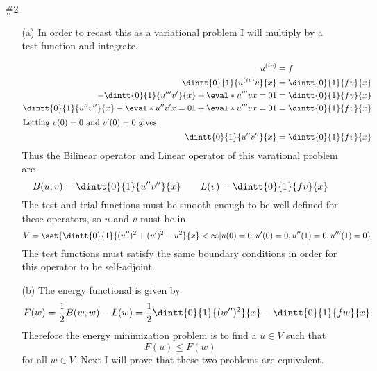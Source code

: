 \documentclass[11pt, oneside]{article}
\begin{document}
\begin{enumerate}
\begin{enumerate}
    \item[(g)]
    \end{enumerate}

  \item[\#2]
    \begin{enumerate}
      \item[(a)]
        In order to recast this as a variational problem I will multiply by a
        test function and integrate.

        \begin{align*}
          u^{(iv)} &= f \\
          \dintt{0}{1}{u^{(iv)}v}{x} &= \dintt{0}{1}{fv}{x} \\
          -\dintt{0}{1}{u'''v'}{x} + \eval*{u'''v}{x = 0}{1} &= \dintt{0}{1}{fv}{x} \\
          \dintt{0}{1}{u''v''}{x} - \eval*{u''v'}{x = 0}{1} + \eval*{u'''v}{x = 0}{1} &= \dintt{0}{1}{fv}{x} \\
          \intertext{Letting $v(0) = 0$ and $v'(0) = 0$ gives}
          \dintt{0}{1}{u''v''}{x} &= \dintt{0}{1}{fv}{x} \\
        \end{align*}
        Thus the Bilinear operator and Linear operator of this varational
        problem are
        \[
          B(u, v) = \dintt{0}{1}{u''v''}{x} \qquad L(v) = \dintt{0}{1}{fv}{x}
        \]
        The test and trial functions must be smooth enough to be well defined
        for these operators, so $u$ and $v$ must be in
        \[
          V = \set{\dintt{0}{1}{(u'')^2 + (u')^2 + u^2}{x} < \infty | u(0) = 0,
            u'(0) = 0, u''(1) = 0, u'''(1) = 0}
        \]
        The test functions must satisfy the same boundary conditions in order
        for this operator to be self-adjoint.

      \item[(b)]
        The energy functional is given by
        \[
          F(w) = \frac{1}{2}B(w, w) - L(w) = \frac{1}{2}\dintt{0}{1}{(w'')^2}{x} - \dintt{0}{1}{fw}{x}
        \]
        Therefore the energy minimization problem is to find a $u \in V$ such that
        \[
          F(u) \le F(w)
        \]
        for all $w \in V$.
        Next I will prove that these two problems are equivalent.


\end{enumerate}
\end{enumerate}
\end{document}
